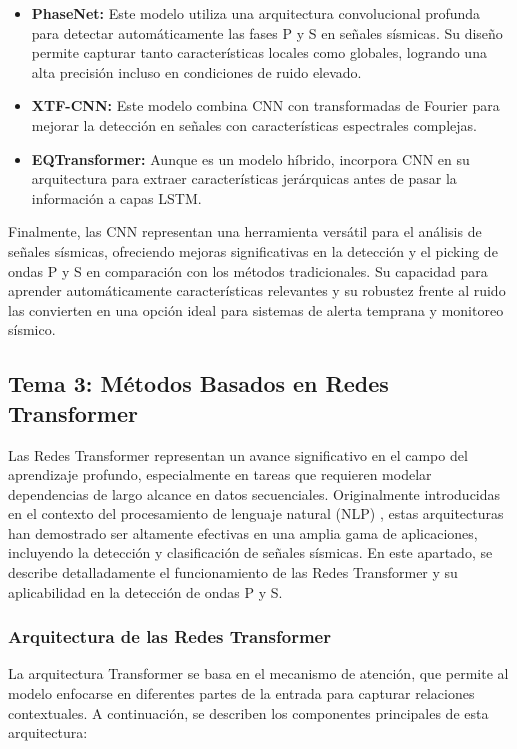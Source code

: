 \begin{itemize}
     \item \textbf{PhaseNet:} Este modelo utiliza una arquitectura convolucional profunda para detectar automáticamente las fases P y S en señales sísmicas. Su diseño permite capturar tanto características locales como globales, logrando una alta precisión incluso en condiciones de ruido elevado.
     \item \textbf{XTF-CNN:} Este modelo combina CNN con transformadas de Fourier para mejorar la detección en señales con características espectrales complejas.
     \item \textbf{EQTransformer:} Aunque es un modelo híbrido, incorpora CNN en su arquitectura para extraer características jerárquicas antes de pasar la información a capas LSTM.
\end{itemize}

Finalmente, las CNN representan una herramienta versátil para el análisis de señales sísmicas, ofreciendo mejoras significativas en la detección y el picking de ondas P y S en comparación con los métodos tradicionales. Su capacidad para aprender automáticamente características relevantes y su robustez frente al ruido las convierten en una opción ideal para sistemas de alerta temprana y monitoreo sísmico.

\subsection{Tema 3: Métodos Basados en Redes Transformer}

Las Redes Transformer representan un avance significativo en el campo del aprendizaje profundo, especialmente en tareas que requieren modelar dependencias de largo alcance en datos secuenciales. Originalmente introducidas en el contexto del procesamiento de lenguaje natural (NLP) \cite{vaswani2017attention}, estas arquitecturas han demostrado ser altamente efectivas en una amplia gama de aplicaciones, incluyendo la detección y clasificación de señales sísmicas. En este apartado, se describe detalladamente el funcionamiento de las Redes Transformer y su aplicabilidad en la detección de ondas P y S.

\subsubsection{Arquitectura de las Redes Transformer}

La arquitectura Transformer se basa en el mecanismo de atención, que permite al modelo enfocarse en diferentes partes de la entrada para capturar relaciones contextuales. A continuación, se describen los componentes principales de esta arquitectura:

